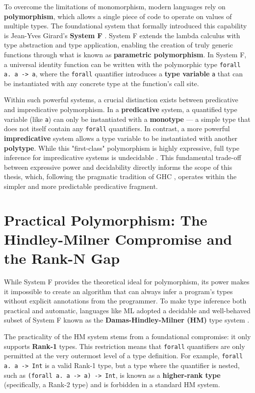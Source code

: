 To overcome the limitations of monomorphism, modern languages rely on \textbf{polymorphism}, which allows a single piece of code to operate on values of multiple types. The foundational system that formally introduced this capability is Jean-Yves Girard's \textbf{System F} \cite{girard-system-f}. System F extends the lambda calculus with type abstraction and type application, enabling the creation of truly generic functions through what is known as \textbf{parametric polymorphism}. In System F, a universal identity function can be written with the polymorphic type \texttt{forall a. a -> a}, where the \texttt{forall} quantifier introduces a \textbf{type variable} \texttt{a} that can be instantiated with any concrete type at the function's call site.

Within such powerful systems, a crucial distinction exists between predicative and impredicative polymorphism. In a \textbf{predicative} system, a quantified type variable (like \texttt{a}) can only be instantiated with a \textbf{monotype} --- a simple type that does not itself contain any \texttt{forall} quantifiers. In contrast, a more powerful \textbf{impredicative} system allows a type variable to be instantiated with another \textbf{polytype}. While this "first-class" polymorphism is highly expressive, full type inference for impredicative systems is undecidable \cite{wells-typability-1999, serrano-quick-2020}. This fundamental trade-off between expressive power and decidability directly informs the scope of this thesis, which, following the pragmatic tradition of GHC \cite{jones-practical-2007}, operates within the simpler and more predictable predicative fragment.

\section{Practical Polymorphism: The Hindley-Milner Compromise and the Rank-N Gap}
\label{sec:LitReviewHM}

While System F provides the theoretical ideal for polymorphism, its power makes it impossible to create an algorithm that can always infer a program's types without explicit annotations from the programmer. To make type inference both practical and automatic, languages like ML adopted a decidable and well-behaved subset of System F known as the \textbf{Damas-Hindley-Milner (HM)} type system \cite{damas-milner}.

The practicality of the HM system stems from a foundational compromise: it only supports \textbf{Rank-1} types. This restriction means that \texttt{forall} quantifiers are only permitted at the very outermost level of a type definition. For example, \texttt{forall a. a -> Int} is a valid Rank-1 type, but a type where the quantifier is nested, such as \texttt{(forall a. a -> a) -> Int}, is known as a \textbf{higher-rank type} (specifically, a Rank-2 type) and is forbidden in a standard HM system.

